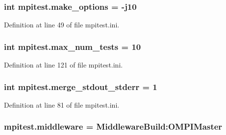 \hypertarget{namespacempitest_a59b1db518516dae2b5daace949760505}{
\subsubsection[{make\-\_\-options}]{\setlength{\rightskip}{0pt plus 5cm}int mpitest.\-make\-\_\-options = -\/j10}}\label{namespacempitest_a59b1db518516dae2b5daace949760505}


Definition at line 49 of file mpitest.\-ini.

\hypertarget{namespacempitest_aa789c1fae4dda8997bf0f7d9a794f877}{
\subsubsection[{max\-\_\-num\-\_\-tests}]{\setlength{\rightskip}{0pt plus 5cm}int mpitest.\-max\-\_\-num\-\_\-tests = 10}}\label{namespacempitest_aa789c1fae4dda8997bf0f7d9a794f877}


Definition at line 121 of file mpitest.\-ini.

\hypertarget{namespacempitest_a458e434e47470db96ce5fd267a120b69}{
\subsubsection[{merge\-\_\-stdout\-\_\-stderr}]{\setlength{\rightskip}{0pt plus 5cm}int mpitest.\-merge\-\_\-stdout\-\_\-stderr = 1}}\label{namespacempitest_a458e434e47470db96ce5fd267a120b69}


Definition at line 81 of file mpitest.\-ini.

\hypertarget{namespacempitest_abda8feed4cda165ed145590c0c693826}{
\subsubsection[{middleware}]{\setlength{\rightskip}{0pt plus 5cm}mpitest.\-middleware = Middleware\-Build\-:\-O\-M\-P\-I\-Master}}\label{namespacempitest_abda8feed4cda165ed145590c0c693826}


